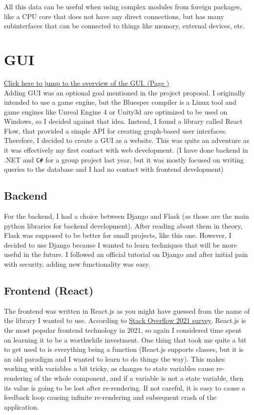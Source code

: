 \documentclass[12pt]{report}
\begin{document}
All this data can be useful when using complex modules from foreign packages, like a CPU core that does not have any direct connections, but has many subinterfaces that can be connected to things like memory, external devices, etc.

\section{GUI}
\hyperref[fig:Overview]{Click here to jump to the overview of the GUI. (Page \pageref{fig:Overview})}
\\
Adding GUI was an optional goal mentioned in the project proposal. I originally intended to use a game engine, but the Bluespec compiler is a Linux tool and game engines like Unreal Engine 4 or Unity3d are optimized to be used on Windows, so I decided against that idea. Instead, I found a library called React Flow, that provided a simple API for creating graph-based user interfaces. Therefore, I decided to create a GUI as a website. This was quite an adventure as it was effectively my first contact with web development. (I have done backend in .NET and \verb!C#! for a group project last year, but it was mostly focused on writing queries to the database and I had no contact with frontend development)

\subsection{Backend}
For the backend, I had a choice between Django and Flask (as those are the main python libraries for backend development). After reading about them in theory, Flask was supposed to be better for small projects, like this one. However, I decided to use Django because I wanted to learn techniques that will be more useful in the future. I followed an official tutorial on Django and after initial pain with security, adding new functionality was easy.

\subsection{Frontend (React)}

The frontend was written in React.js as you might have guessed from the name of the library I wanted to use. According to \href{https://insights.stackoverflow.com/survey/2021#most-popular-technologies-webframe}{Stack Overflow 2021 survey}, React.js is the most popular frontend technology in 2021, so again I considered time spent on learning it to be a worthwhile investment. One thing that took me quite a bit to get used to is everything being a function (React.js supports classes, but it is an old paradigm and I wanted to learn to do things the  way). This makes working with variables a bit tricky, as changes to state variables cause re-rendering of the whole component, and if a variable is not a state variable, then its value is going to be lost after re-rendering. If not careful, it is easy to cause a feedback loop causing infinite re-rendering and subsequent crash of the application.
\end{document}
